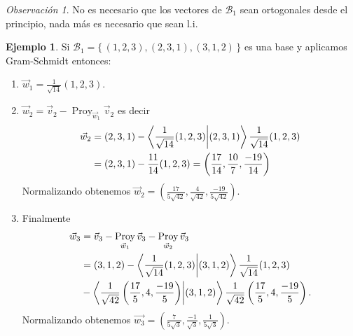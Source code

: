 \documentclass[12pt]{article}
\theoremstyle{plain}
\theoremstyle{definition}
\newtheorem{Ex}[Th]{Ejemplo}           %
\theoremstyle{remark}
\newtheorem*{Rmk}{Observación}      %
\DeclareMathOperator{\Proy}{Proy}   %
\newcommand{\cB}{\mathcal{B}}       %
\renewcommand{\:}{\colon}           %
\renewcommand{\.}{\Cdot}                %
\newcommand{\set}[1]{\{\,#1\,\}}    %
\begin{document}
\begin{multicols}{2}
\begin{Rmk}
  No es necesario que los vectores de $\cB_1$ sean ortogonales desde el principio, nada más es necesario que sean l.i.
\end{Rmk}

\begin{Ex}
  Si $\cB_1=\set{(1,2,3),(2,3,1),(3,1,2)}$ es una base y aplicamos Gram-Schmidt entonces:
  \begin{enumerate}
    \itemsep=-0.42em
    \item $\vec{w}_1=\frac{1}{\sqrt{14}}(1,2,3)$.
    \item $\vec{w}_2=\vec{v}_2-\Proy_{\vec{w}_1}\vec{v}_2$ es decir
    \begin{align*}
      \vec{w}_2&=(2,3,1)-\braket{\frac{1}{\sqrt{14}}(1,2,3)}{(2,3,1)}\frac{1}{\sqrt{14}}(1,2,3)\\
      &=(2,3,1)-\frac{11}{14}(1,2,3)=\left(\frac{17}{14},\frac{10}{7},\frac{-19}{14}\right)
    \end{align*}
    Normalizando obtenemos $\vec{w}_2=\left(\frac{17}{5\sqrt{42}},\frac{4}{\sqrt{42}},\frac{-19}{5\sqrt{42}}\right)$.
    \item Finalmente 
    \begin{align*}
      \vec{w}_3&=\vec{v}_3-\Proy_{\vec{w}_1}\vec{v}_3-\Proy_{\vec{w}_2}\vec{v}_3\\
      &=(3,1,2)-\braket{\frac{1}{\sqrt{14}}(1,2,3)}{(3,1,2)}\frac{1}{\sqrt{14}}(1,2,3)\\
      &-\braket{\frac{1}{\sqrt{42}}\left(\frac{17}{5},4,\frac{-19}{5}\right)}{(3,1,2)}\frac{1}{\sqrt{42}}\left(\frac{17}{5},4,\frac{-19}{5}\right).
    \end{align*}
    Normalizando obtenemos $\vec{w_3}=\left(\frac{7}{5\sqrt{3}},\frac{-1}{\sqrt{3}},\frac{1}{5\sqrt{3}}\right)$.
  \end{enumerate}
\end{Ex}
\end{multicols}
\end{document}

